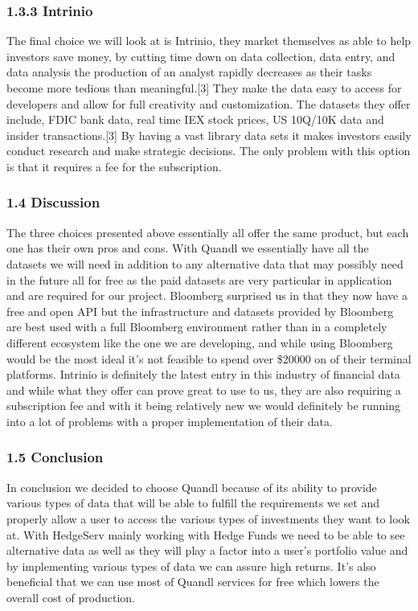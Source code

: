 \documentclass[onecolumn, draftclsnofoot,10pt, compsoc]{IEEEtran}
\begin{document}
\subsubsection{1.3.3 Intrinio}
The final choice we will look at is Intrinio, they market themselves as able to help investors save money, by cutting time down on data collection, data entry, and data analysis the production of an analyst rapidly decreases as their tasks become more tedious than meaningful.[3] They make the data easy to access for developers and allow for full creativity and customization. The datasets they offer include, FDIC bank data, real time IEX stock prices, US 10Q/10K data and insider transactions.[3] By having a vast library data sets it makes investors easily conduct research and make strategic decisions. The only problem with this option is that it requires a fee for the subscription. 


\subsubsection{1.4 Discussion}
The three choices presented above essentially all offer the same product, but each one has their own pros and cons. With Quandl we essentially have all the datasets we will need in addition to any alternative data that may possibly need in the future all for free as the paid datasets are very particular in application and are required for our project. Bloomberg surprised us in that they now have a free and open API but the infrastructure and datasets provided by Bloomberg are best used with a full Bloomberg environment rather than in a completely different ecosystem like the one we are developing, and while using Bloomberg would be the most ideal it's not feasible to spend over \$20000 on of their terminal platforms. Intrinio is definitely the latest entry in this industry of financial data and while what they offer can prove great to use to us, they are also requiring a subscription fee and with it being relatively new we would definitely be running into a lot of problems with a proper implementation of their data. 

\subsubsection{1.5 Conclusion}
In conclusion we decided to choose Quandl because of its ability to provide various types of data that will be able to fulfill the requirements we set and properly allow a user to access the various types of investments they want to look at. With HedgeServ mainly working with Hedge Funds we need to be able to see alternative data as well as they will play a factor into a user’s portfolio value and by implementing various types of data we can assure high returns. It's also beneficial that we can use most of Quandl services for free which lowers the overall cost of production. 
\end{document}
